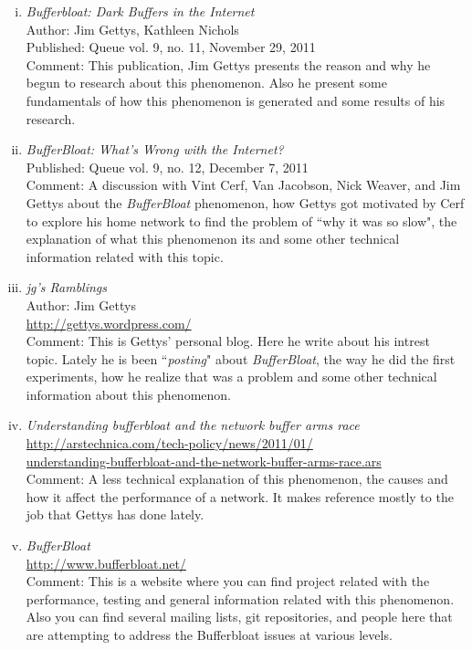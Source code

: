 \begin{enumerate}[i.-]
\item \textit{Bufferbloat: Dark Buffers in the Internet}\\
	Author: Jim Gettys, Kathleen Nichols\\
	Published: Queue vol. 9, no. 11, November 29, 2011\\
	Comment: This publication, Jim Gettys presents the reason and why he begun to research about this phenomenon. Also he present some fundamentals of how this phenomenon is generated and some results of his research.
\item \textit{BufferBloat: What's Wrong with the Internet?}\\
	Published: Queue vol. 9, no. 12, December 7, 2011\\
	Comment: A discussion with Vint Cerf, Van Jacobson, Nick Weaver, and Jim Gettys about the \textit{BufferBloat} phenomenon, how Gettys got motivated by Cerf to explore his home network to find the problem of ``why it was so slow", the explanation of what this phenomenon its and some other technical information related with this topic.
\item \textit{jg's Ramblings}\\
	Author: Jim Gettys\\
	\url{http://gettys.wordpress.com/}\\
	Comment: This is Gettys' personal blog. Here he write about his intrest topic. Lately he is been ``\textit{posting}" about \textit{BufferBloat}, the way he did the first experiments, how he realize that was a problem and some other technical information about this phenomenon.
\item \textit{Understanding bufferbloat and the network buffer arms race}\\
	\url{http://arstechnica.com/tech-policy/news/2011/01/}\\
	\url{understanding-bufferbloat-and-the-network-buffer-arms-race.ars}\\
	Comment: A less technical explanation of this phenomenon, the causes and how it affect the performance of a network. It makes reference mostly to the job that Gettys has done lately.
\item \textit{BufferBloat}\\
	\url{http://www.bufferbloat.net/}\\
	Comment: This is a website where you can find project related with the performance, testing and general information related with this phenomenon. Also you can find several mailing lists, git repositories, and people here that are attempting to address the Bufferbloat issues at various levels.
\end{enumerate}
